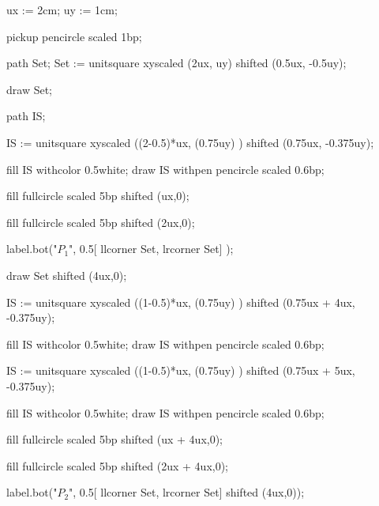 \usebodyfont[termes,10pt]

\startMPdefinitions
  ux := 2cm;
  uy := 1cm;
\stopMPdefinitions


\startMPpage[offset=1mm]
  pickup pencircle scaled 1bp;

  path Set;
  Set := unitsquare xyscaled (2ux, uy) 
         shifted (0.5ux, -0.5uy);

  draw Set;

  path IS;

  IS := unitsquare xyscaled ((2-0.5)*ux, (0.75uy) )
        shifted (0.75ux, -0.375uy);

  fill IS withcolor 0.5white;
  draw IS withpen pencircle scaled 0.6bp;

  fill fullcircle scaled 5bp 
       shifted (ux,0);

  fill fullcircle scaled 5bp 
       shifted (2ux,0);

  label.bot("$P_1$", 0.5[ llcorner Set, lrcorner Set] );

  draw Set shifted (4ux,0);

  IS := unitsquare xyscaled ((1-0.5)*ux, (0.75uy) )
        shifted (0.75ux + 4ux, -0.375uy);

  fill IS withcolor 0.5white;
  draw IS withpen pencircle scaled 0.6bp;

  IS := unitsquare xyscaled ((1-0.5)*ux, (0.75uy) )
        shifted (0.75ux + 5ux, -0.375uy);

  fill IS withcolor 0.5white;
  draw IS withpen pencircle scaled 0.6bp;

  fill fullcircle scaled 5bp 
       shifted (ux + 4ux,0);

  fill fullcircle scaled 5bp 
       shifted (2ux + 4ux,0);


  label.bot("$P_2$", 0.5[ llcorner Set, lrcorner Set] shifted (4ux,0));

\stopMPpage

